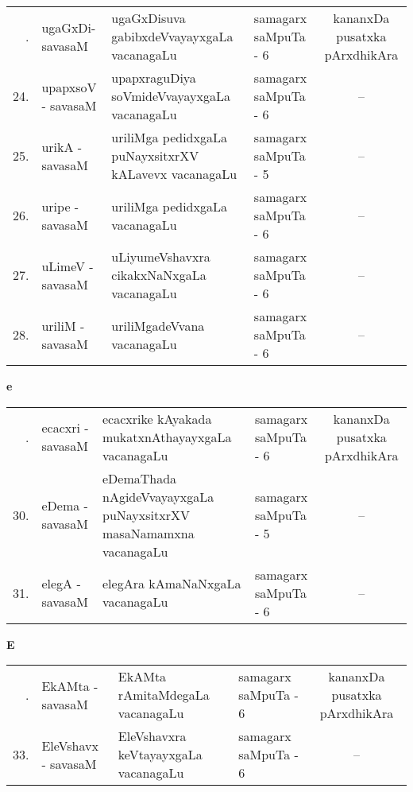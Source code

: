 {\renewcommand{\arraystretch}{1.35}
\begin{longtable}{rl>{\raggedright}p{5.5cm}lc}
\endfirsthead
\endhead
\endfoot
\endlastfoot
23. &  ugaGxDi- savasaM & ugaGxDisuva gabibxdeVvayayxgaLa vacanagaLu & samagarx saMpuTa - 6  & kananxDa pusatxka pArxdhikAra\\
24. &  upapxsoV - savasaM & upapxraguDiya soVmideVvayayxgaLa\newline \phantom{AA} vacanagaLu & samagarx saMpuTa - 6 & --\\
25. &  urikA - savasaM & uriliMga pedidxgaLa puNayxsitxrXV kALavevx\newline \phantom{AA} vacanagaLu & samagarx saMpuTa - 5 & --\\
26. &  uripe - savasaM & uriliMga pedidxgaLa vacanagaLu & samagarx saMpuTa - 6 & --\\
27. &  uLimeV - savasaM & uLiyumeVshavxra cikakxNaNxgaLa vacanagaLu & samagarx saMpuTa - 6  & --\\
28. &  uriliM - savasaM & uriliMgadeVvana vacanagaLu & samagarx saMpuTa - 6 & --\\
\end{longtable}}
\bigskip

\centerline{\bf e}

\medskip
{\renewcommand{\arraystretch}{1.35}
\begin{longtable}{rl>{\raggedright}p{5.5cm}lc}
\endfirsthead
\endhead
\endfoot
\endlastfoot
29. &  ecacxri - savasaM &  ecacxrike kAyakada mukatxnAthayayxgaLa\newline \phantom{AA} vacanagaLu & samagarx saMpuTa - 6  & kananxDa pusatxka pArxdhikAra\\
30. &  eDema - savasaM &  eDemaThada nAgideVvayayxgaLa puNayxsitxrXV\newline \phantom{AA} masaNamamxna vacanagaLu & samagarx saMpuTa - 5 & --\\
31. &  elegA - savasaM &  elegAra kAmaNaNxgaLa vacanagaLu & samagarx saMpuTa - 6 & --\\
\end{longtable}}
\bigskip

\centerline{\bf E}

\medskip
{\renewcommand{\arraystretch}{1.35}
\begin{longtable}{rl>{\raggedright}p{5.5cm}lc}
\endfirsthead
\endhead
\endfoot
\endlastfoot
32. &  EkAMta - savasaM &  EkAMta rAmitaMdegaLa vacanagaLu & samagarx saMpuTa - 6  & kananxDa pusatxka pArxdhikAra\\
33. &  EleVshavx - savasaM &  EleVshavxra keVtayayxgaLa vacanagaLu & samagarx saMpuTa - 6 & --\\
\end{longtable}}
\bigskip

